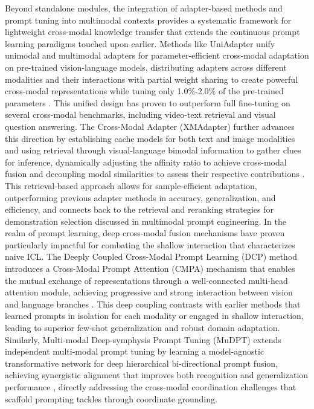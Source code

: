 \documentclass[11pt]{article}
\begin{document}
Beyond standalone modules, the integration of adapter-based methods and prompt tuning into multimodal contexts provides a systematic framework for lightweight cross-modal knowledge transfer that extends the continuous prompt learning paradigms touched upon earlier. Methods like UniAdapter unify unimodal and multimodal adapters for parameter-efficient cross-modal adaptation on pre-trained vision-language models, distributing adapters across different modalities and their interactions with partial weight sharing to create powerful cross-modal representations while tuning only 1.0\%-2.0\% of the pre-trained parameters \cite{ref247}. This unified design has proven to outperform full fine-tuning on several cross-modal benchmarks, including video-text retrieval and visual question answering. The Cross-Modal Adapter (XMAdapter) further advances this direction by establishing cache models for both text and image modalities and using retrieval through visual-language bimodal information to gather clues for inference, dynamically adjusting the affinity ratio to achieve cross-modal fusion and decoupling modal similarities to assess their respective contributions \cite{ref248}. This retrieval-based approach allows for sample-efficient adaptation, outperforming previous adapter methods in accuracy, generalization, and efficiency, and connects back to the retrieval and reranking strategies for demonstration selection discussed in multimodal prompt engineering. In the realm of prompt learning, deep cross-modal fusion mechanisms have proven particularly impactful for combating the shallow interaction that characterizes naive ICL. The Deeply Coupled Cross-Modal Prompt Learning (DCP) method introduces a Cross-Modal Prompt Attention (CMPA) mechanism that enables the mutual exchange of representations through a well-connected multi-head attention module, achieving progressive and strong interaction between vision and language branches \cite{ref224}. This deep coupling contrasts with earlier methods that learned prompts in isolation for each modality or engaged in shallow interaction, leading to superior few-shot generalization and robust domain adaptation. Similarly, Multi-modal Deep-symphysis Prompt Tuning (MuDPT) extends independent multi-modal prompt tuning by learning a model-agnostic transformative network for deep hierarchical bi-directional prompt fusion, achieving synergistic alignment that improves both recognition and generalization performance \cite{ref249}, directly addressing the cross-modal coordination challenges that scaffold prompting tackles through coordinate grounding.
\end{document}
